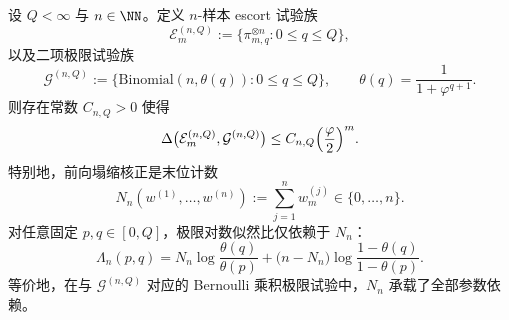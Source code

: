 \begin{theorem}\label{thm:xi-time-part9sb-escort-fixed-n-binomial-blackwell}
设 \(Q<\infty\) 与 \(n\in\NN\)。定义 \(n\)-样本 escort 试验族
\[
\mathcal E_m^{(n,Q)}:=\{\pi_{m,q}^{\otimes n}:0\le q\le Q\},
\]
以及二项极限试验族
\[
\mathcal G^{(n,Q)}:=\{\mathrm{Binomial}(n,\theta(q)):0\le q\le Q\},
\qquad
\theta(q)=\frac{1}{1+\varphi^{q+1}}.
\]
则存在常数 \(C_{n,Q}>0\) 使得
\[
\Delta\bigl(\mathcal E_m^{(n,Q)},\mathcal G^{(n,Q)}\bigr)
\le
C_{n,Q}\Bigl(\frac{\varphi}{2}\Bigr)^m.
\]
特别地，前向塌缩核正是末位计数
\[
N_n(w^{(1)},\dots,w^{(n)})
:=
\sum_{j=1}^n w_m^{(j)}\in\{0,\dots,n\}.
\]
对任意固定 \(p,q\in[0,Q]\)，极限对数似然比仅依赖于 \(N_n\)：
\[
\Lambda_n(p,q)
=
N_n\log\frac{\theta(q)}{\theta(p)}
+
\bigl(n-N_n\bigr)\log\frac{1-\theta(q)}{1-\theta(p)}.
\]
等价地，在与 \(\mathcal G^{(n,Q)}\) 对应的 Bernoulli 乘积极限试验中，\(N_n\) 承载了全部参数依赖。
\end{theorem}
